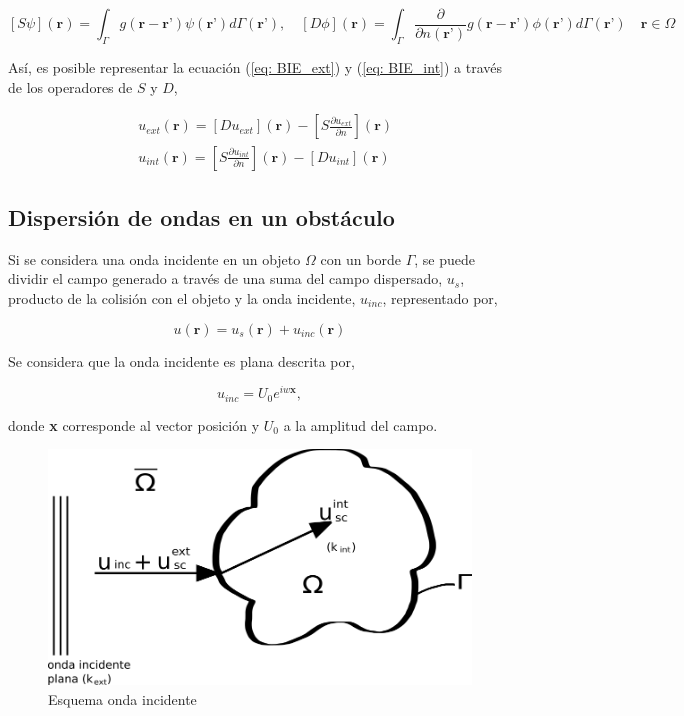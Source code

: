 \documentclass[12pt,letterpaper]{article}
\numberwithin{equation}{section}
\begin{document}
$$[S\psi](\textbf{r})=\int_{\Gamma}g(\textbf{r}-\textbf{r'})\psi(\textbf{r'}) d\varGamma(\textbf{r'}), \quad [D\phi](\textbf{r})=\int_{\Gamma}\frac{\partial}{\partial n(\textbf{r'})} g(\textbf{r}-\textbf{r'})\phi(\textbf{r'}) d\varGamma(\textbf{r'}) \quad \textbf{r}\in\Omega$$

Así, es posible representar la ecuación (\ref{eq: BIE_ext}) y (\ref{eq: BIE_int}) a través de los operadores de $S$ y $D$,

\begin{equation}
\begin{split}
	&u_{ext}(\textbf{r})=\left[D u_{ext}\right](\textbf{r}) - \left[S \frac{\partial u_{ext}}{\partial n}\right](\textbf{r})\\
	&u_{int}(\textbf{r})= \left[S \frac{\partial u_{int}}{\partial n}\right](\textbf{r}) - \left[D u_{int}\right](\textbf{r})
\end{split}
	\label{eq: BIE_potencial}
\end{equation}

\subsection{Dispersión de ondas en un obstáculo}

Si se considera una onda incidente en un objeto $\Omega$ con un borde $\Gamma$, se puede dividir el campo generado a través de una suma del campo dispersado, $u_s$, producto de la colisión con el objeto y la onda incidente, $u_{inc}$, representado por,

\begin{equation}
	u(\textbf{r})=u_s(\textbf{r})+u_{inc}(\textbf{r})
	\label{eq: separacion de onda}
\end{equation} 

Se considera que la onda incidente es plana descrita por,

$$u_{inc}=U_0 e^{iw\textbf{x}},$$

donde \textbf{x} corresponde al vector posición y $U_0$ a la amplitud del campo.

\begin{figure}[H]
	\centering\includegraphics[scale=0.5]{Imagenes/esquema_uinc.png}
	\caption{Esquema onda incidente}
	\label{fig:esquema_u_inc}
\end{figure}
\end{document}
